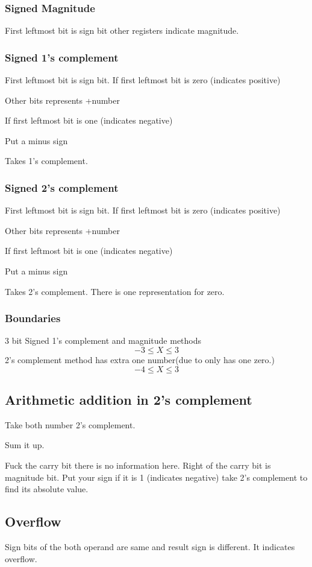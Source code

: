 \documentclass[11pt]{article}
\begin{document}
\subsubsection*{Signed Magnitude}
First leftmost bit is sign bit other registers indicate magnitude.
\subsubsection*{Signed 1's complement}
First leftmost bit is sign bit.
If first leftmost bit is zero (indicates positive)

Other bits represents +number

If first leftmost bit is one (indicates negative)

Put a minus sign

Takes 1's complement.

\subsubsection*{Signed 2's complement}
First leftmost bit is sign bit.
If first leftmost bit is zero (indicates positive)

Other bits represents +number

If first leftmost bit is one (indicates negative)

Put a minus sign

Takes 2's complement.
There is one representation for zero.

\subsubsection*{Boundaries}
3 bit Signed 1's complement and magnitude methods
\[-3\leq X \leq 3\] 
2's complement method has extra one number(due to only has one zero.)
\[-4 \leq X \leq 3\]

\subsection*{Arithmetic addition in 2's complement}
Take both number 2's complement.

Sum it up. 

Fuck the carry bit there is no information here. Right of the carry bit is magnitude bit. Put your sign if it is 1 (indicates negative) take 2's complement to find its absolute value.

\subsection*{Overflow}
Sign bits of the both operand are same and result sign is different. It indicates overflow.
\end{document}
